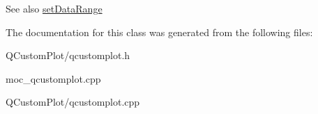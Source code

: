 \begin{DoxySeeAlso}{See also}
\mbox{\hyperlink{class_q_c_p_color_map_a980b42837821159786a85b4b7dcb8774}{set\+Data\+Range}} 
\end{DoxySeeAlso}


The documentation for this class was generated from the following files\+:\begin{DoxyCompactItemize}
\item 
Q\+Custom\+Plot/qcustomplot.\+h\item 
moc\+\_\+qcustomplot.\+cpp\item 
Q\+Custom\+Plot/qcustomplot.\+cpp\end{DoxyCompactItemize}
